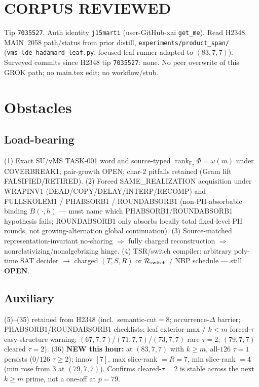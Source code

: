 \documentclass[11pt]{article}
\begin{document}
\section*{CORPUS REVIEWED}
Tip \texttt{7035527}. Auth identity \texttt{j15marti} (user-GitHub-xai \texttt{get\_me}).
Read H2348, MAIN~2058 path/status from prior distill,
\texttt{experiments/product\_span/} (\texttt{vms\_lde\_hadamard\_leaf.py},
focused leaf runner adapted to $(83,7,7)$).
Surveyed commits since H2348 tip \texttt{7035527}: none.
No peer overwrite of this GROK path; no main.tex edit; no workflow/stub.

\section*{Obstacles}
\subsection*{Load-bearing}
(1) Exact SU/vMS TASK-001 word and source-typed
$\operatorname{rank}_{\mathbb F_2}\Phi=\omega(m)$ under COVERBREAK1; pair-growth OPEN;
char-$2$ pitfalls retained (Gram lift FALSIFIED/RETIRED).
(2) Forced SAME\_REALIZATION acquisition under WRAPINV1
(DEAD/COPY/DELAY/INTERP/RECOMP) and FULLSKOLEM1 / PHABSORB1 / ROUNDABSORB1
(non-PH-absorbable binding $B(\cdot,h)$ --- must name which PHABSORB1/ROUNDABSORB1 hypothesis fails;
ROUNDABSORB1 only absorbs locally total fixed-level PH rounds, not growing-alternation global continuation).
(3) Source-matched representation-invariant no-sharing $\Rightarrow$ fully charged reconstruction
$\Rightarrow$ nonrelativizing/nonalgebrizing hinge.
(4) TSR/switch compiler: arbitrary poly-time SAT decider $\to$ charged $(T,S,R)$ or
$\mathcal R_{\rm switch}$ / NBP schedule --- still \textbf{OPEN}.

\subsection*{Auxiliary}
(5)--(35) retained from H2348 (incl.\ semantic-cut$=8$; occurrence-$\Delta$ barrier;
PHABSORB1/ROUNDABSORB1 checklists; leaf exterior-max / $k{<}m$ forced-$\tau$ easy-structure warning;
$(67,7,7)$/$(71,7,7)$/$(73,7,7)$ rare $\tau{=}2$; $(79,7,7)$ cleared $\tau{=}2$).
(36) \textbf{NEW this hour:} at $(83,7,7)$ with $k{\ge}m$, all-$126$ $\tau{=}1$ persists
($0/126$ $\tau{\ge}2$); innov $[7]$, max slice-rank $=R{=}7$, min slice-rank $=4$
(min rose from $3$ at $(79,7,7)$). Confirms cleared-$\tau{=}2$ is stable across the next
$k{\ge}m$ prime, not a one-off at $p{=}79$.
\end{document}

